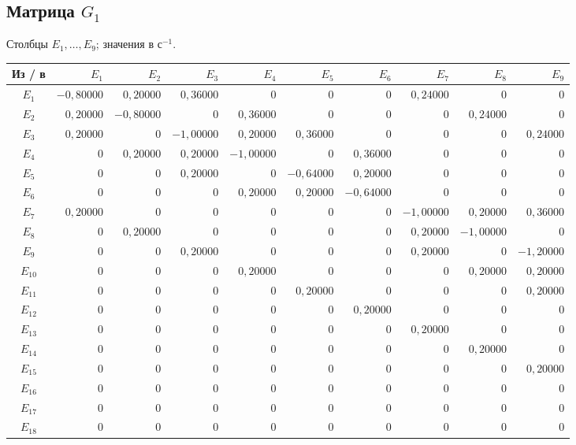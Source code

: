 \documentclass[12pt,a4paper]{article}
\begin{document}
\subsection{Матрица $G_1$}
\noindent Столбцы $E_{1},\ldots,E_{9}$; значения в $\text{с}^{-1}$.
\begin{center}\scriptsize\setlength{\tabcolsep}{2.6pt}\renewcommand{\arraystretch}{1.18}
\begin{tabular}{|c|r|r|r|r|r|r|r|r|r|}\hline
Из / в&$E_{1}$&$E_{2}$&$E_{3}$&$E_{4}$&$E_{5}$&$E_{6}$&$E_{7}$&$E_{8}$&$E_{9}$\\\hline
$E_{1}$&$-0{,}80000$&$0{,}20000$&$0{,}36000$&$0$&$0$&$0$&$0{,}24000$&$0$&$0$\\\hline
$E_{2}$&$0{,}20000$&$-0{,}80000$&$0$&$0{,}36000$&$0$&$0$&$0$&$0{,}24000$&$0$\\\hline
$E_{3}$&$0{,}20000$&$0$&$-1{,}00000$&$0{,}20000$&$0{,}36000$&$0$&$0$&$0$&$0{,}24000$\\\hline
$E_{4}$&$0$&$0{,}20000$&$0{,}20000$&$-1{,}00000$&$0$&$0{,}36000$&$0$&$0$&$0$\\\hline
$E_{5}$&$0$&$0$&$0{,}20000$&$0$&$-0{,}64000$&$0{,}20000$&$0$&$0$&$0$\\\hline
$E_{6}$&$0$&$0$&$0$&$0{,}20000$&$0{,}20000$&$-0{,}64000$&$0$&$0$&$0$\\\hline
$E_{7}$&$0{,}20000$&$0$&$0$&$0$&$0$&$0$&$-1{,}00000$&$0{,}20000$&$0{,}36000$\\\hline
$E_{8}$&$0$&$0{,}20000$&$0$&$0$&$0$&$0$&$0{,}20000$&$-1{,}00000$&$0$\\\hline
$E_{9}$&$0$&$0$&$0{,}20000$&$0$&$0$&$0$&$0{,}20000$&$0$&$-1{,}20000$\\\hline
$E_{10}$&$0$&$0$&$0$&$0{,}20000$&$0$&$0$&$0$&$0{,}20000$&$0{,}20000$\\\hline
$E_{11}$&$0$&$0$&$0$&$0$&$0{,}20000$&$0$&$0$&$0$&$0{,}20000$\\\hline
$E_{12}$&$0$&$0$&$0$&$0$&$0$&$0{,}20000$&$0$&$0$&$0$\\\hline
$E_{13}$&$0$&$0$&$0$&$0$&$0$&$0$&$0{,}20000$&$0$&$0$\\\hline
$E_{14}$&$0$&$0$&$0$&$0$&$0$&$0$&$0$&$0{,}20000$&$0$\\\hline
$E_{15}$&$0$&$0$&$0$&$0$&$0$&$0$&$0$&$0$&$0{,}20000$\\\hline
$E_{16}$&$0$&$0$&$0$&$0$&$0$&$0$&$0$&$0$&$0$\\\hline
$E_{17}$&$0$&$0$&$0$&$0$&$0$&$0$&$0$&$0$&$0$\\\hline
$E_{18}$&$0$&$0$&$0$&$0$&$0$&$0$&$0$&$0$&$0$\\\hline
\end{tabular}\end{center}
\end{document}
